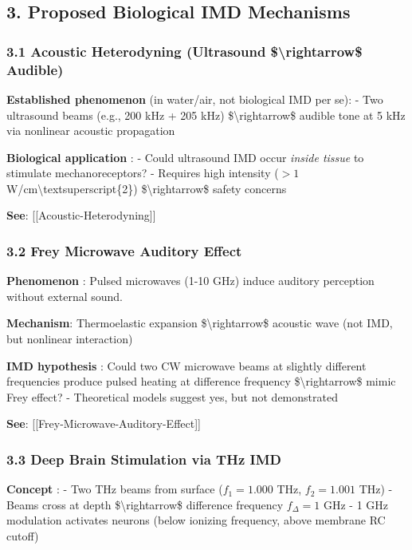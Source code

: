 \subsection{3. Proposed Biological IMD
Mechanisms}\label{proposed-biological-imd-mechanisms}

\subsubsection{3.1 Acoustic Heterodyning (Ultrasound
\$\textbackslash rightarrow\$
Audible)}\label{acoustic-heterodyning-ultrasound-audible}

\textbf{Established phenomenon} (in water/air, not biological IMD per
se): - Two ultrasound beams (e.g., 200 kHz + 205 kHz)
\$\textbackslash rightarrow\$ audible tone at 5 kHz via nonlinear
acoustic propagation

\textbf{Biological application} : - Could ultrasound IMD occur
\emph{inside tissue} to stimulate mechanoreceptors? - Requires high
intensity (\(>1\) W/cm\textbackslash textsuperscript\{2\})
\$\textbackslash rightarrow\$ safety concerns

\textbf{See}: {[}{[}Acoustic-Heterodyning{]}{]}

\subsubsection{3.2 Frey Microwave Auditory
Effect}\label{frey-microwave-auditory-effect}

\textbf{Phenomenon} : Pulsed microwaves (1-10 GHz) induce auditory
perception without external sound.

\textbf{Mechanism}: Thermoelastic expansion
\$\textbackslash rightarrow\$ acoustic wave (not IMD, but nonlinear
interaction)

\textbf{IMD hypothesis} : Could two CW microwave beams at slightly
different frequencies produce pulsed heating at difference frequency
\$\textbackslash rightarrow\$ mimic Frey effect? - Theoretical models
suggest yes, but not demonstrated

\textbf{See}: {[}{[}Frey-Microwave-Auditory-Effect{]}{]}

\subsubsection{3.3 Deep Brain Stimulation via THz
IMD}\label{deep-brain-stimulation-via-thz-imd}

\textbf{Concept} : - Two THz beams from surface (\(f_1 = 1.000\) THz,
\(f_2 = 1.001\) THz) - Beams cross at depth
\$\textbackslash rightarrow\$ difference frequency \(f_{\Delta} = 1\)
GHz - 1 GHz modulation activates neurons (below ionizing frequency,
above membrane RC cutoff)

